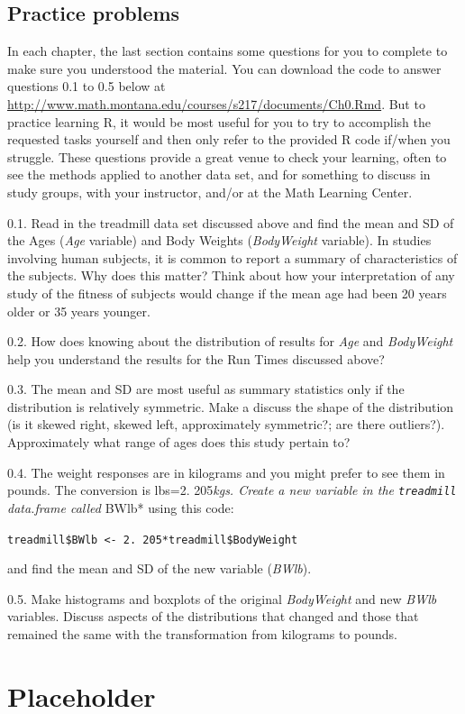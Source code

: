 \documentclass[]{book}
\begin{document}
\section{Practice problems}\label{practice-problems}

In each chapter, the last section contains some questions for you to
complete to make sure you understood the material. You can download the
code to answer questions 0.1 to 0.5 below at
\url{http://www.math.montana.edu/courses/s217/documents/Ch0.Rmd}. But to
practice learning R, it would be most useful for you to try to
accomplish the requested tasks yourself and then only refer to the
provided R code if/when you struggle. These questions provide a great
venue to check your learning, often to see the methods applied to
another data set, and for something to discuss in study groups, with
your instructor, and/or at the Math Learning Center.

0.1. Read in the treadmill data set discussed above and find the mean
and SD of the Ages (\emph{Age} variable) and Body Weights
(\emph{BodyWeight} variable). In studies involving human subjects, it is
common to report a summary of characteristics of the subjects. Why does
this matter? Think about how your interpretation of any study of the
fitness of subjects would change if the mean age had been 20 years older
or 35 years younger.

0.2. How does knowing about the distribution of results for \emph{Age}
and \emph{BodyWeight} help you understand the results for the Run Times
discussed above?

0.3. The mean and SD are most useful as summary statistics only if the
distribution is relatively symmetric. Make a discuss the shape of the
distribution (is it skewed right, skewed left, approximately symmetric?;
are there outliers?). Approximately what range of ages does this study
pertain to?

0.4. The weight responses are in kilograms and you might prefer to see
them in pounds. The conversion is lbs=2. 205\emph{kgs. Create a new
variable in the \texttt{treadmill}\\
data.frame called }BWlb* using this code:

\texttt{treadmill\$BWlb\ \textless{}-\ 2.\ 205*treadmill\$BodyWeight}

and find the mean and SD of the new variable (\emph{BWlb}).

0.5. Make histograms and boxplots of the original \emph{BodyWeight} and
new \emph{BWlb} variables. Discuss aspects of the distributions that
changed and those that remained the same with the transformation from
kilograms to pounds.

\chapter{Placeholder}\label{placeholder}


\end{document}
